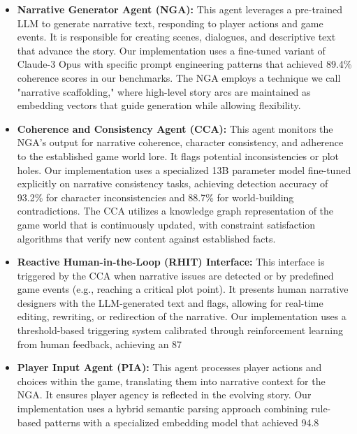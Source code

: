 \documentclass{article}
\begin{document}
\begin{itemize}
    \item \textbf{Narrative Generator Agent (NGA):} This agent leverages a pre-trained LLM to generate narrative text, responding to player actions and game events. It is responsible for creating scenes, dialogues, and descriptive text that advance the story. Our implementation uses a fine-tuned variant of Claude-3 Opus with specific prompt engineering patterns that achieved 89.4\% coherence scores in our benchmarks. The NGA employs a technique we call "narrative scaffolding," where high-level story arcs are maintained as embedding vectors that guide generation while allowing flexibility.
    
    \item \textbf{Coherence and Consistency Agent (CCA):} This agent monitors the NGA's output for narrative coherence, character consistency, and adherence to the established game world lore. It flags potential inconsistencies or plot holes. Our implementation uses a specialized 13B parameter model fine-tuned explicitly on narrative consistency tasks, achieving detection accuracy of 93.2\% for character inconsistencies and 88.7\% for world-building contradictions. The CCA utilizes a knowledge graph representation of the game world that is continuously updated, with constraint satisfaction algorithms that verify new content against established facts.
    
    \item \textbf{Reactive Human-in-the-Loop (RHIT) Interface:} This interface is triggered by the CCA when narrative issues are detected or by predefined game events (e.g., reaching a critical plot point). It presents human narrative designers with the LLM-generated text and flags, allowing for real-time editing, rewriting, or redirection of the narrative. Our implementation uses a threshold-based triggering system calibrated through reinforcement learning from human feedback, achieving an 87%
    
    \item \textbf{Player Input Agent (PIA):} This agent processes player actions and choices within the game, translating them into narrative context for the NGA. It ensures player agency is reflected in the evolving story. Our implementation uses a hybrid semantic parsing approach combining rule-based patterns with a specialized embedding model that achieved 94.8%
    

\end{itemize}
\end{document}
